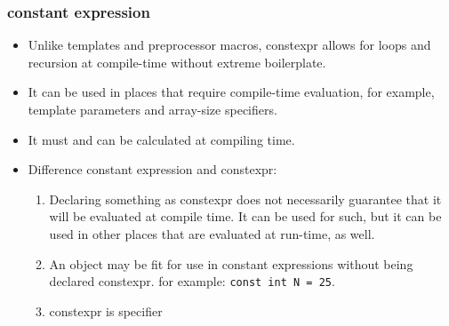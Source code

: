 \documentclass[a4paper,11pt,twoside]{book}
\begin{document}
\subsubsection{constant expression}
\begin{itemize}
	\item Unlike templates and preprocessor macros, constexpr allows for loops and recursion at compile-time without extreme boilerplate.
	
	\item It can be used in places that require compile-time evaluation, for example, template parameters and array-size specifiers.
	
	\item It must and can be calculated at compiling time.
	
	\item Difference constant expression and constexpr:
	\begin{enumerate}
		\item Declaring something as constexpr does not necessarily guarantee that it will be evaluated at compile time. It can be used for such, but it can be used in other places that are evaluated at run-time, as well.
		
		\item An object may be fit for use in constant expressions without being declared constexpr. for example: \texttt{const int N = 25}.
		
		\item constexpr is specifier
	\end{enumerate}
	
\end{itemize}
\end{document}
